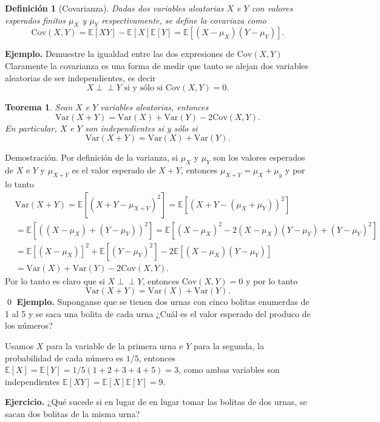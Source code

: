 \documentclass[letterpaper]{book}
\newcommand{\ind}{\perp\!\!\!\!\perp}
\newtheorem{teorema}{Teorema}[section]
\newtheorem{def.}{Definici\'on}[section]
\newcommand{\esp}{\mathbb E}
\newcommand{\eje}{{\newline \noindent \sc \textbf{Ejercicio. }}}
\newcommand{\exe}{{\newline \noindent \sc \textbf{Ejemplo. }}}
\newcommand{\dem}{{\noindent \sc Demostraci\'on. }}
\begin{document}
\begin{def.}[Covarianza]
Dadas dos variables aleatorias \(X\) e \(Y\) con valores esperados finitos \(\mu_X\) y \(\mu_Y\) respectivamente, se define la covariaza como
\[
\mathrm{Cov}(X,Y)=\esp[XY]-\esp[X]\esp[Y]=\esp[(X-\mu_X)(Y-\mu_Y)].
\]
\end{def.}
\exe Demuestre la igualdad entre las dos expresiones de \(\mathrm{Cov}(X,Y)\)
\noindent Claramente la covarianza es una forma de medir que tanto se alejan dos variables aleatorias de ser independientes, es decir
\[
X\ind Y\text{ si y sólo si }\mathrm{Cov}(X,Y)=0.
\]
\begin{teorema}
Sean $X$ e $Y$ variables aleatorias, entonces
\begin{equation}
\mathrm{Var}(X+Y)=\mathrm{Var}(X)+\mathrm{Var}(Y)-2\mathrm{Cov}(X,Y).
\end{equation}
En particular, $X$ e $Y$ son independientes si y sólo si 
\begin{equation}
\mathrm{Var}(X+Y)=\mathrm{Var}(X)+\mathrm{Var}(Y).
\end{equation}
\end{teorema}
\dem Por definición de la varianza, si \(\mu_X\) y \(\mu_Y\) son los valores esperados de \(X\) e \(Y\) y \(\mu_{X+Y}\) es el valor esperado de \(X+Y\), entonces \(\mu_{X+Y}=\mu_X+\mu_y\) y por lo tanto
\begin{align*}
&\mathrm{Var}(X+Y)=\esp[(X+Y-\mu_{X+Y})^2]=\esp[(X+Y-(\mu_{X}+\mu_{Y}))^2]\\
&=\esp[((X-\mu_{X})+(Y-\mu_{Y}))^2]=\esp[(X-\mu_X)^2-2(X-\mu_X)(Y-\mu_Y)+(Y-\mu_Y)^2]\\
&=\esp[(X-\mu_X)]^2+\esp[(Y-\mu_Y)^2]-2\esp[(X-\mu_X)(Y-\mu_Y)]\\
&=\mathrm{Var}(X)+\mathrm{Var}(Y)-2\mathrm{Cov}(X,Y).
\end{align*}
Por lo tanto es claro que si \(X\ind Y\), entonces \(\mathrm{Cov}(X,Y)=0\) y por lo tanto
\[
\mathrm{Var}(X+Y)=\mathrm{Var}(X)+\mathrm{Var}(Y).
\]
\qed
\exe Suponganse que se tienen dos urnas con cinco bolitas enumerdas de 1 al 5 y se saca una bolita de cada urna ¿Cuál es el valor esperado del produco de los números?

\noindent Usamos \(X\) para la variable de la primera urna e \(Y\) para la segunda, la probabilidad de cada número es \(1/5\), entonces \(\esp[X]=\esp[Y]=1/5(1+2+3+4+5)=3\), como ambas variables son independientes \(\esp[XY]=\esp[X]\esp[Y]=9\).  

\eje ¿Qué sucede si en lugar de en lugar tomar las bolitas de dos urnas, se sacan dos bolitas de la misma urna?
\end{document}

